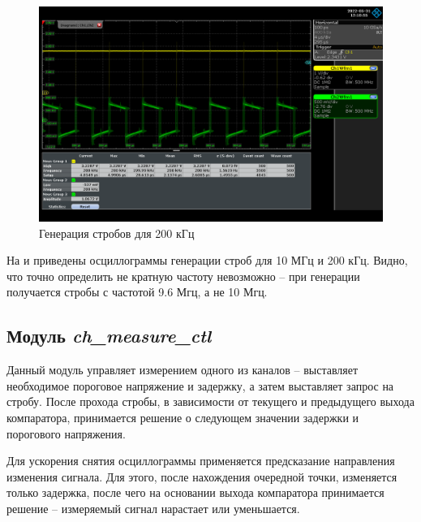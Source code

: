 \begin{figure}[ht!] 
	\center
	\includegraphics  [scale=0.3] {my_folder/images//stb_200khz}
	\caption{Генерация стробов для 200 кГц} 
	\label{fig:stb-200khz}  
\end{figure}

\FloatBarrier

На  и  приведены осциллограммы генерации строб для 10 МГц и 200 кГц.
Видно, что точно определить не кратную частоту невозможно -- при генерации получается стробы с частотой 9.6 Мгц, а не 10 Мгц.

\subsection{Модуль \emph{ch\_measure\_ctl}}

Данный модуль управляет измерением одного из каналов -- выставляет необходимое пороговое напряжение и задержку, а
затем выставляет запрос на стробу. После прохода стробы, в зависимости от текущего и предыдущего выхода компаратора, принимается решение
о следующем значении задержки и порогового напряжения.

Для ускорения снятия осциллограммы применяется предсказание направления изменения сигнала. Для этого, после нахождения очередной точки,
изменяется только задержка, после чего на основании выхода компаратора принимается решение -- измеряемый сигнал нарастает или уменьшается.

